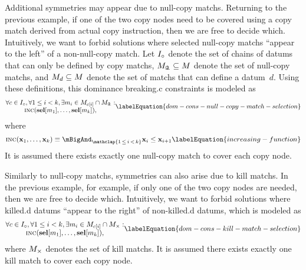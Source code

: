 Additional symmetries may appear due to \glspl{null-copy match}.
%
Returning to the previous example, if one of the two \glspl{copy node} need to
be covered using a \gls{copy match} derived from actual copy \gls{instruction},
then we are free to decide which.
%
Intuitively, we want to forbid \glspl{solution} where selected \glspl{null-copy
  match} ``appear to the left'' of a non-\gls{null-copy match}.
%
Let $\mInterchDataSet[\mCopy]$ denote the set of chains of \glspl{datum} that
can only be defined by \glspl{copy match}, \mbox{$\mNullCopyMatchSet \subseteq
  \mMatchSet$} denote the set of \glspl{null-copy match}, and
\mbox{$\mMatchSet[d] \subseteq \mMatchSet$} denote the set of \glspl{match} that
can define a \gls{datum}~$d$.
%
Using these definitions, this \gls{dominance breaking.c} \glspl{constraint} is
modeled as
%
\begin{equation}
  \begin{array}{@{}c@{}}
    \forall c \in \mInterchDataSet[\mCopy],
    \forall 1 \leq i < k,
    \exists m_i \in \mMatchSet[c[i]] \cap \mNullCopyMatchSet : \\
    \mIncreasing(\mVar{sel}[m_1], \ldots, \mVar{sel}[m_k]),
  \end{array}
  \labelEquation{dom-cons-null-copy-match-selection}
\end{equation}
%
where
%
\begin{equation}
  \mIncreasing(\mVar{x}_1, \ldots, \mVar{x}_k)
  \equiv
  \mBigAnd_{\mathclap{1 \,\leq\, i \,<\, k}}
  \mVar{x}_{i} \leq \mVar{x}_{i + 1}
  \labelEquation{increasing-function}
\end{equation}
%
It is assumed there exists exactly one \gls{null-copy match} to cover each
\gls{copy node}.

Similarly to \glspl{null-copy match}, symmetries can also arise due to
\glspl{kill match}.
%
In the previous example, for example, if only one of the two \glspl{copy node}
are needed, then we are free to decide which.
%
Intuitively, we want to forbid \glspl{solution} where \gls{killed.d}
\glspl{datum} ``appear to the right'' of non-\gls{killed.d} \glspl{datum}, which
is modeled as
%
\begin{equation}
  \begin{array}{@{}c@{}}
    \forall c \in \mInterchDataSet[\mCopy],
    \forall 1 \leq i < k,
    \exists m_i \in \mMatchSet[c[i]] \cap \mKillMatchSet : \\
    \mIncreasing(\mVar{sel}[m_1], \ldots, \mVar{sel}[m_k]),
  \end{array}
  \labelEquation{dom-cons-kill-match-selection}
\end{equation}
%
where $\mKillMatchSet$ denotes the set of \glspl{kill match}.
%
It is assumed there exists exactly one \gls{kill match} to cover each \gls{copy
  node}.


